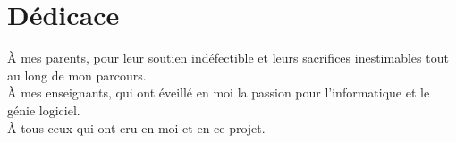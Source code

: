 \chapter*{\hfill Dédicace \hfill}


\vspace{3cm}

\begin{center}
À mes parents, pour leur soutien indéfectible et leurs sacrifices inestimables tout au long de mon parcours.\\[0.5cm]
À mes enseignants, qui ont éveillé en moi la passion pour l'informatique et le génie logiciel.\\[0.5cm]
À tous ceux qui ont cru en moi et en ce projet.

\end{center}